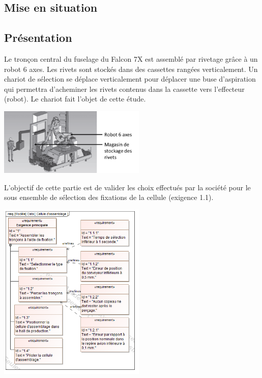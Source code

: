 \documentclass[10pt,fleqn]{article} %
\begin{document}

\vspace{7cm}
\pagestyle{fancy}
\thispagestyle{plain}

\setlength{\columnseprule}{0.4pt}
\begin{multicols}{2}
\section*{Mise en situation}
\subsection*{Présentation}
Le tronçon central du fuselage du Falcon 7X est assemblé par rivetage grâce à un robot 6 axes. Les rivets sont stockés dans des cassettes rangées verticalement. Un chariot de sélection se déplace verticalement pour déplacer une buse d’aspiration qui permettra d’acheminer les rivets contenus dans la cassette vers l’effecteur (robot). Le chariot fait l’objet de cette étude.

\begin{center}
\includegraphics[width=7cm]{images/image5}
\end{center} 

 
L'objectif de cette partie est de valider les choix effectués par la société pour le sous ensemble de sélection des fixations de la cellule (exigence 1.1).

\vfill

\begin{center}
\includegraphics[width=7cm]{images/image6}
\end{center} 





\end{multicols}
\end{document}
